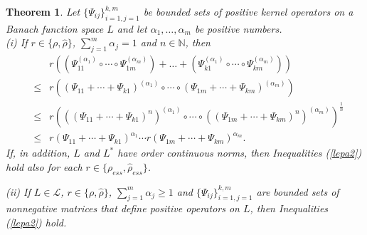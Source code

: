 \documentclass[12pt, reqno]{amsart}
\newtheorem{theorem}{Theorem}[section]
\theoremstyle{definition}
\theoremstyle{remark}
\numberwithin{equation}{section}
\newcommand{\NN}{\mathbb{N}}
\begin{document}
\begin{theorem}
\label{finally2}
Let $\{\Psi _{i j}\}_{i=1, j=1}^{k, m}$ be bounded sets of positive kernel operators on a Banach function space $L$ and let
 $\alpha _1, \ldots , \alpha _m$ be positive numbers.   \\

\noindent (i) If  $r \in \{\rho, \hat{\rho}\}$, $\sum _{j=1} ^m \alpha _j = 1$ and $n \in \NN$, then
%
\begin{eqnarray}
\nonumber
& & r \left(\left(\Psi_{1 1}^{(\alpha _1)} \circ \cdots \circ \Psi_{1 m}^{(\alpha _m)}\right) + \ldots + \left(\Psi_{k 1}^{(\alpha _1)} \circ \cdots \circ \Psi_{k m}^{(\alpha _m)} \right) \right) \\
\nonumber
& \le &r \left((\Psi_{1 1}+ \cdots  + \Psi_{k 1})^{(\alpha _1)} \circ \cdots
\circ (\Psi_{1 m} + \cdots  + \Psi_{k m})^{(\alpha _m)}\right)\\
\nonumber
& \le &r \left(((\Psi_{1 1} + \cdots  + \Psi_{k 1})^n)^{(\alpha _1)} \circ \cdots
\circ ((\Psi_{1 m} + \cdots + \Psi_{k m})^n)^{(\alpha _m)}\right)^{\frac{1}{n}}\\
&\le&r \left( \Psi_{1 1} + \cdots  + \Psi_{k 1} \right)^{\alpha _1} \cdots
r \left( \Psi_{1 m} + \cdots  + \Psi_{k m}\right)^{\alpha _m} .
\label{lepa2}
\end{eqnarray}
If, in addition, $L$ and $L^*$ have order continuous norms, then Inequalities (\ref{lepa2}) hold also for each $r\in \{ \rho _{ess}, \hat{\rho} _{ess}\}$.

\noindent(ii) If $L\in\mathcal L$, $r \in \{\rho, \hat{\rho}\}$, $\sum_{j=1}^{m} \alpha _j\ge 1$ and $\{\Psi_{i j}\}_{i=1, j=1}^{k, m}$ are bounded sets of nonnegative matrices that define positive operators on $L$, then Inequalities (\ref{lepa2}) hold. 
\end{theorem}
\end{document}
